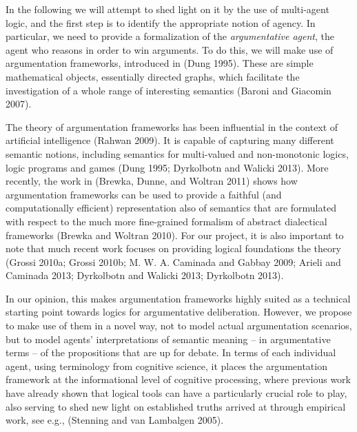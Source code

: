 \documentclass{article}
\begin{document}
In the following we will attempt to shed light on it by the use of multi-agent logic, and the first step is to identify the appropriate notion of agency. In particular, we need to provide a formalization of the \emph{argumentative agent}, the agent who reasons in order to win arguments. To do this, we will make use of argumentation frameworks, introduced in (Dung 1995). These are simple mathematical objects, essentially directed graphs, which facilitate the investigation of a whole range of interesting semantics (Baroni and Giacomin 2007). 

The theory of argumentation frameworks has been influential in the context of artificial intelligence (Rahwan 2009). It is capable of capturing many different semantic notions, including semantics for multi-valued and non-monotonic logics, logic programs and games (Dung 1995; Dyrkolbotn and Walicki 2013). More recently, the work in (Brewka, Dunne, and Woltran 2011) shows how argumentation frameworks can be used to provide a faithful (and computationally efficient) representation also of semantics that are formulated with respect to the much more fine-grained formalism of abstract dialectical frameworks (Brewka and Woltran 2010). For our project, it is also important to note that much recent work focuses on providing logical foundations the theory (Grossi 2010a; Grossi 2010b; M. W. A. Caminada and Gabbay 2009; Arieli and Caminada 2013; Dyrkolbotn and Walicki 2013; Dyrkolbotn 2013).

In our opinion, this makes argumentation frameworks highly suited as a technical starting point towards logics for argumentative deliberation. However, we propose to make use of them in a novel way, not to model actual argumentation scenarios, but to model agents' interpretations of semantic meaning -- in argumentative terms -- of the propositions that are up for debate.  In terms of each individual agent, using terminology from cognitive science, it places the argumentation framework at the informational level of cognitive processing, where previous work have already shown that logical tools can have a particularly crucial role to play, also serving to shed new light on established truths arrived at through empirical work, see e.g., (Stenning and van Lambalgen 2005). 
\end{document}
